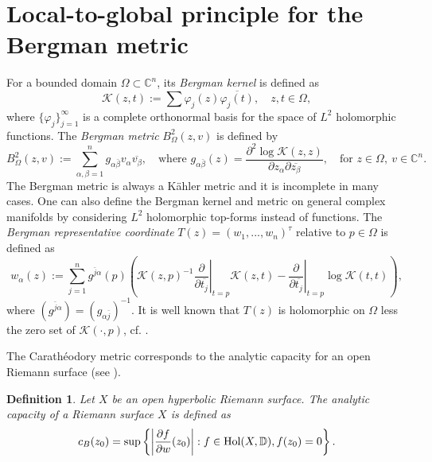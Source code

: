 \documentclass[12pt] {article}
\newtheorem{definition}[theorem]{Definition}
\numberwithin{equation}{section}
\begin{document}
   

\section{Local-to-global principle for the Bergman metric}






For a bounded domain $\Omega \subset \mathbb{C}^n$, its  {\it Bergman kernel} is defined as
$$
\mathcal{K}(z, t) := \sum \varphi_j(z) \overline{\varphi_j(t)}, \quad z, t \in \Omega,
$$
where $\{\varphi_j\}_{j=1}^{\infty}$ is a complete orthonormal basis for the space of $L^2$ holomorphic functions. The  {\it Bergman metric} $B^2_\Omega(z, v)$ is defined by
$$
B^{2}_{\Omega}(z, v) := \sum_{\alpha, \beta = 1}^n g_{\alpha \bar{\beta}} v_\alpha \overline{v_\beta}, \quad \text{where } g_{\alpha \bar{\beta}}(z) = \frac{\partial^2 \log \mathcal{K}(z, z)}{\partial z_\alpha \partial \overline{z_\beta}}, \quad \text{for } z \in \Omega,\ v \in \mathbb{C}^n.
$$
The Bergman metric is always a K\"ahler metric and it is incomplete in many cases. One can also define the Bergman kernel and metric on general complex manifolds by considering $L^2$ holomorphic top-forms instead of functions.
The {\it Bergman representative coordinate} $T (z) =(w_1, ... , w_n)^{\tau}$ relative to $p\in  \Omega$ is defined as
\begin{equation} \label{rep}
w_{\alpha} (z):=\sum _{j=1}^{n} g^{\bar j \alpha }(p) \left(\mathcal{K}(z, p) ^{-1} \left. \frac{\partial}{\partial \overline {t_j} } \right|_{t=p} \mathcal{K}(z, t)  -    \left. \frac{\partial}{\partial \overline {t_j} } \right|_{t=p}  \log \mathcal{K}(t, t)\right),
\end{equation}
where $(g^{\bar j \alpha })  = (g_{\alpha \bar{j}})^{-1}$. It is well known  that $T (z)$ is holomorphic on $\Omega $ less the zero set of $\mathcal K(\cdot , p)$, cf. \cite{GKK}.


\medskip



  The Carath\'eodory metric corresponds to the analytic capacity for an open Riemann surface (see \cite{Su73}).  


\begin{definition}


Let $X$ be an open hyperbolic Riemann surface.   
The analytic capacity of a Riemann surface $X$ is defined as
 $$
c_B(z_0) = \sup\left \{ \left|{\partial f \over \partial w}(z_0)\right|: f \in \hbox{Hol}(X, \mathbb{D}), f(z_0) = 0\right \}.
$$
\end{definition}
\end{document}
